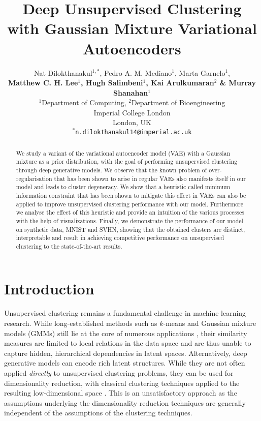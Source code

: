 \documentclass{article} \usepackage{iclr2017_conference,times}
\title{Deep Unsupervised Clustering with Gaussian Mixture Variational Autoencoders}
\author{Nat Dilokthanakul$^{1,*}$, Pedro A. M. Mediano$^1$, Marta Garnelo$^1$,\\
\textbf{Matthew C. H. Lee$^1$, Hugh Salimbeni$^1$, Kai Arulkumaran$^2$ \& Murray Shanahan$^1$}\\
$^1$Department of Computing, $^2$Department of Bioengineering\\
Imperial College London\\
London, UK\\
$^*$\texttt{n.dilokthanakul14@imperial.ac.uk}
}
\begin{document}
\maketitle

\begin{abstract}








We study a variant of the variational autoencoder model (VAE) with a Gaussian mixture as a prior distribution, with the goal of performing unsupervised clustering through deep generative models. We observe that the known problem of over-regularisation that has been shown to arise in regular VAEs also manifests itself in our model and leads to cluster degeneracy. We show that a heuristic called minimum information constraint that has been shown to mitigate this effect in VAEs can also be applied to improve unsupervised clustering performance with our model. Furthermore we analyse the effect of this heuristic and provide an intuition of the various processes with the help of visualizations. Finally, we demonstrate the performance of our model on synthetic data, MNIST and SVHN, showing that the obtained clusters are distinct, interpretable and result in achieving competitive performance on unsupervised clustering to the state-of-the-art results. 

\end{abstract}


\section{Introduction}

Unsupervised clustering remains a fundamental challenge in machine learning research. While long-established methods such as $k$-means and Gaussian mixture models (GMMs) \citep{bishop2006pattern} still lie at the core of numerous applications \citep{aggarwal2013data}, their similarity measures are limited to local relations in the data space and are thus unable to capture hidden, hierarchical dependencies in latent spaces. Alternatively, deep generative models can encode rich latent structures. While they are not often applied \emph{directly} to unsupervised clustering problems, they can be used for dimensionality reduction, with classical clustering techniques applied to the resulting low-dimensional space \citep{xie2015unsupervised}. This is an unsatisfactory approach as the assumptions underlying the dimensionality reduction techniques are generally independent of the assumptions of the clustering techniques.
\end{document}
